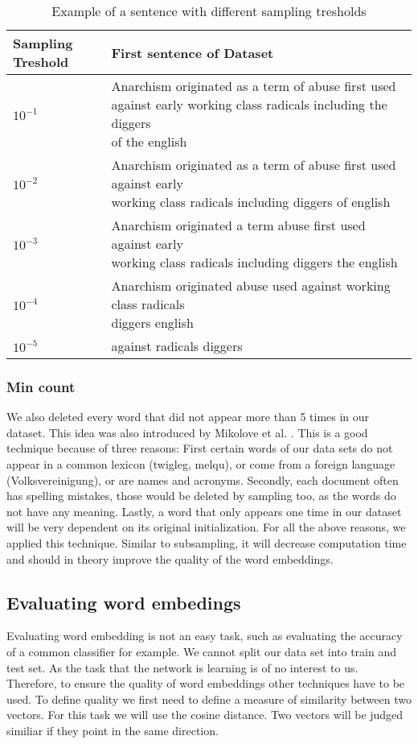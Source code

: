 \begin{table*}[tb]\centering
\caption{Example of a sentence with different sampling tresholds}
    \begin{tabular}{l l}%
        \toprule
Sampling Treshold & First sentence of Dataset \\ 
        \midrule%
$10^{-1}$ & \makecell[l]{Anarchism originated as a term of abuse first used against early working class radicals including the diggers\\ of the english} \\ \hline
$10^{-2}$  & \makecell[l]{ Anarchism originated as a term of abuse first used against early \\ working class radicals including diggers of english} \\ \hline
$10^{-3}$ & \makecell[l]{Anarchism originated a term abuse first used against early \\ working class radicals including diggers the english}\\ \hline
$10^{-4}$ &\makecell[l]{ Anarchism originated abuse used against working class radicals\\ diggers english} \\ \hline
$10^{-5}$ & against radicals diggers \\ \hline        
        \midrule%
   \end{tabular}%
\label{table:treshold_examples}
\end{table*}
\fi


\subsubsection{Min count}
We also deleted every word that did not appear more than 5 times in our dataset. This idea was also introduced by Mikolove et al. \citep{mikolov2}. This is a good technique because of three reasons: First certain words of our data sets do not appear in a common lexicon (twigleg, melqu), or come from a foreign language (Volksvereinigung), or are names and acronyms. Secondly, each document often has spelling mistakes, those would be deleted by sampling too, as the words do not have any meaning. Lastly, a word that only appears one time in our dataset will be very dependent on its original initialization. For all the above reasons, we applied this technique. Similar to subsampling, it will decrease computation time and  should in theory improve the quality of the word embeddings.

\subsection{Evaluating word embedings}
Evaluating word embedding is not an easy task, such as evaluating the accuracy of a common classifier for example. We cannot split our data set into train and test set. As the task that the network is learning is of no interest to us. Therefore, to ensure the quality of word embeddings other techniques have to be used. To define quality we first need to define a measure of similarity between two vectors. For this task we will use the cosine distance. Two vectors will be judged similiar if they point in the same direction. 


